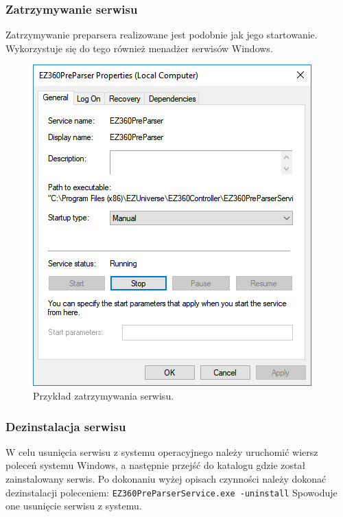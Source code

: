 \documentclass[a4paper]{book}
\begin{document}
\subsubsection{Zatrzymywanie serwisu}
Zatrzymywanie preparsera realizowane jest podobnie jak jego startowanie. Wykorzystuje się do tego również menadżer serwisów Windows.
\begin{figure}[t]
	\centering
	\includegraphics[width=\textwidth]{./img/zatrzymywanie_serwisu.png}
	\caption{Przykład zatrzymywania serwisu.}
	\label{fig:zatrzymywanie_serwisu}
\end{figure}
\subsubsection{Dezinstalacja serwisu}
W celu usunięcia serwisu z systemu operacyjnego należy uruchomić wiersz poleceń systemu Windows, a następnie przejść do katalogu gdzie został zainstalowany serwis. Po dokonaniu wyżej opisach czynności należy dokonać dezinstalacji poleceniem: \newline
\texttt{EZ360PreParserService.exe -uninstall}
\newline Spowoduje one usunięcie serwisu z systemu. 
\end{document}
